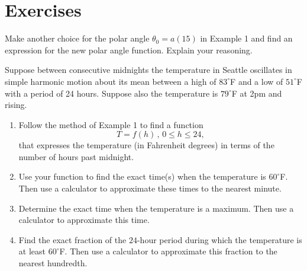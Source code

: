 \documentclass{ximera}
\begin{document}
\section{Exercises}

\begin{exercise} \label{Exmf210dc}
Make another choice for the polar angle $\theta_0=a(15)$ in Example  1 and find an expression for the new polar angle function. Explain your reasoning.
\end{exercise}

\begin{exercise} \label{Ex39v39}
Suppose between consecutive midnights the temperature in Seattle oscillates in simple harmonic motion about its mean between a high of $83^\circ$F and a low of $51^\circ$F with a period of 24 hours. Suppose also the temperature is $79^\circ$F at 2pm and rising.

\begin{enumerate}
\item Follow the method of Example 1 to find a function 
\[
  T = f(h) \, , \, 0\leq h \leq 24,
\]
that expresses the temperature (in Fahrenheit degrees) in terms of the number of hours past midnight.

\item Use your function to find the exact time(s) when the temperature is $60^\circ$F. Then use a calculator to approximate these times to the nearest minute.

\item Determine the exact time when the temperature is a maximum. Then use a calculator to approximate this time.

\item Find the exact fraction of the $24$-hour period during which the temperature is at least $60^\circ$F. Then use a calculator to approximate this fraction to the nearest hundredth.
\end{enumerate}

\end{exercise}
\end{document}
